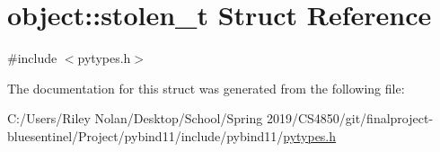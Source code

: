 \hypertarget{structobject_1_1stolen__t}{}\section{object\+::stolen\+\_\+t Struct Reference}
\label{structobject_1_1stolen__t}


{\ttfamily \#include $<$pytypes.\+h$>$}



The documentation for this struct was generated from the following file\+:\begin{DoxyCompactItemize}
\item 
C\+:/\+Users/\+Riley Nolan/\+Desktop/\+School/\+Spring 2019/\+C\+S4850/git/finalproject-\/bluesentinel/\+Project/pybind11/include/pybind11/\mbox{\hyperlink{pytypes_8h}{pytypes.\+h}}\end{DoxyCompactItemize}
